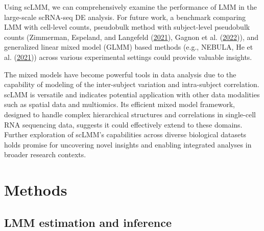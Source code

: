 \documentclass[
]{article}
\begin{document}
Using scLMM, we can comprehensively examine the performance of LMM in
the large-scale scRNA-seq DE analysis. For future work, a benchmark
comparing LMM with cell-level counts, pseudobulk method with
subject-level pseudobulk counts (Zimmerman, Espeland, and Langefeld
(\protect\hyperlink{ref-Zimmerman2021}{2021}), Gagnon et al.
(\protect\hyperlink{ref-MSMCSim2022}{2022})), and generalized linear
mixed model (GLMM) based methods (e.g., NEBULA, He et al.
(\protect\hyperlink{ref-nebula}{2021})) across various experimental
settings could provide valuable insights.

The mixed models have become powerful tools in data analysis due to the
capability of modeling of the inter-subject variation and intra-subject
correlation. scLMM is versatile and indicates potential application with
other data modalities such as spatial data and multiomics. Its efficient
mixed model framework, designed to handle complex hierarchical
structures and correlations in single-cell RNA sequencing data, suggests
it could effectively extend to these domains. Further exploration of
scLMM's capabilities across diverse biological datasets holds promise
for uncovering novel insights and enabling integrated analyses in
broader research contexts.

\hypertarget{methods}{%
\section{Methods}\label{methods}}

\hypertarget{lmm-estimation-and-inference}{%
\subsection{LMM estimation and
inference}\label{lmm-estimation-and-inference}}
\end{document}
